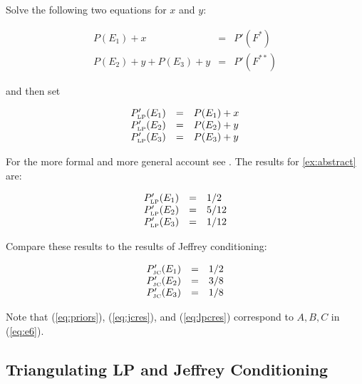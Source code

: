 \documentclass[11pt]{article}
\begin{document}
Solve the following two equations for $x$ and $y$:

\begin{equation}
  \label{eq:lpce}
  \begin{array}{rcl}
    P(E_{1})+x&=&P'(F^{*}) \\
    P(E_{2})+y+P(E_{3})+y&=&P'(F^{**})
  \end{array}
\end{equation}

and then set

\begin{equation}
  \label{eq:lpcf}
  \begin{array}{rcl}
    P'_{\mbox{\tiny LP}}(E_{1})&=&P(E_{1})+x \\
    P'_{\mbox{\tiny LP}}(E_{2})&=&P(E_{2})+y \\
    P'_{\mbox{\tiny LP}}(E_{3})&=&P(E_{3})+y
  \end{array}
\end{equation}

For the more formal and more general account see
. The results for {\xample}
\ref{ex:abstract} are:

\begin{equation}
  \label{eq:lpcres}
  \begin{array}{rcl}
    P'_{\mbox{\tiny LP}}(E_{1})&=&1/2 \\
    P'_{\mbox{\tiny LP}}(E_{2})&=&5/12 \\
    P'_{\mbox{\tiny LP}}(E_{3})&=&1/12
  \end{array}
\end{equation}

Compare these results to the results of Jeffrey conditioning:

\begin{equation}
  \label{eq:jcres}
  \begin{array}{rcl}
    P'_{\mbox{\tiny JC}}(E_{1})&=&1/2 \\
    P'_{\mbox{\tiny JC}}(E_{2})&=&3/8 \\
    P'_{\mbox{\tiny JC}}(E_{3})&=&1/8
  \end{array}
\end{equation}

Note that (\ref{eq:priors}), (\ref{eq:jcres}), and (\ref{eq:lpcres})
correspond to $A,B,C$ in (\ref{eq:e6}). 

\subsection{Triangulating LP and Jeffrey Conditioning}
\label{subsec:ieseiwoh}
\end{document}

